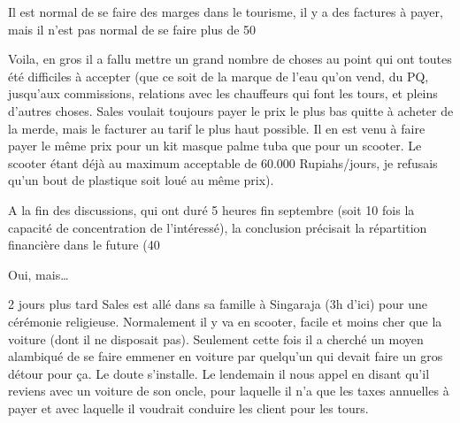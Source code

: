\begin{multicols}{2}
Il est normal de se faire des marges dans le tourisme, il y a des factures à payer, mais il n’est pas normal de se faire plus de 50%

Voila, en gros il a fallu mettre un grand nombre de choses au point qui ont toutes été difficiles à accepter (que ce soit de la marque de l’eau qu’on vend, du PQ, jusqu’aux commissions, relations avec les chauffeurs qui font les tours, et pleins d’autres choses. Sales voulait toujours payer le prix le plus bas quitte à acheter de la merde, mais le facturer au tarif le plus haut possible. Il en est venu à faire payer le même prix pour un kit masque palme tuba que pour un scooter. Le scooter étant déjà au maximum acceptable de 60.000 Rupiahs/jours, je refusais qu’un bout de plastique soit loué au même prix).

A la fin des discussions, qui ont duré 5 heures fin septembre (soit 10 fois la capacité de concentration de l’intéressé), la conclusion précisait la répartition financière dans le future (40%

Oui, mais…

2 jours plus tard Sales est allé dans sa famille à Singaraja (3h d’ici) pour une cérémonie religieuse. Normalement il y va en scooter, facile et moins cher que la voiture (dont il ne disposait pas). Seulement cette fois il a cherché un moyen alambiqué de se faire emmener en voiture par quelqu’un qui devait faire un gros détour pour ça. Le doute s’installe. Le lendemain il nous appel en disant qu’il reviens avec un voiture de son oncle, pour laquelle il n’a que les taxes annuelles à payer et avec laquelle il voudrait conduire les client pour les tours.


\end{multicols}
